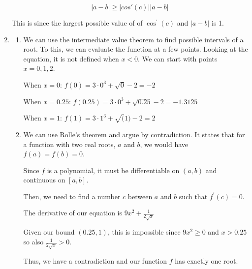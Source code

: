 \documentclass[11pt, letterpaper, twoside]{article}
\begin{document}
\begin{enumerate}
\[|a-b|\geq |cos\prime(c)||a-b|\]

This is since the largest possible value of of \(\cos^\prime(c)\) and \(|a-b|\) is 1.

\item %
\begin{enumerate}[label=\alph*]
\item
We can use the intermediate value theorem to find possible intervals of a root. 
To this, we can evaluate the function at a few points. 
Looking at the equation, it is not defined when \(x<0\). 
We can start with points \(x=0, 1, 2\).

When \(x=0\): \(f(0)=3\cdot0^3+\sqrt{0}-2=-2\)

When \(x=0.25\): \(f(0.25)=3\cdot0^3+\sqrt{0.25}-2=-1.3125\)

When \(x=1\): \(f(1)=3\cdot1^3+\sqrt(1)-2=2\)

\item
We can use Rolle's theorem and argue by contradiction.
It states that for a function with two real roots, \(a\) and \(b\), we would have \(f(a)=f(b)=0\).

Since \(f\) is a polynomial, it must be differentiable on \((a, b)\) and continuous on \([a,b]\).

Then, we need to find a number \(c\) between \(a\) and \(b\) such that \(f^\prime(c)=0\).

The derivative of our equation is \(9x^2+\frac{1}{2\sqrt x}\)

Given our bound \((0.25, 1)\), this is impossible since \(9x^2\geq0\) and \(x>0.25\) so also \(\frac{1}{2\sqrt x}>0\).

Thus, we have a contradiction and our function \(f\) has exactly one root.

\end{enumerate}

\end{enumerate}
\end{document}

